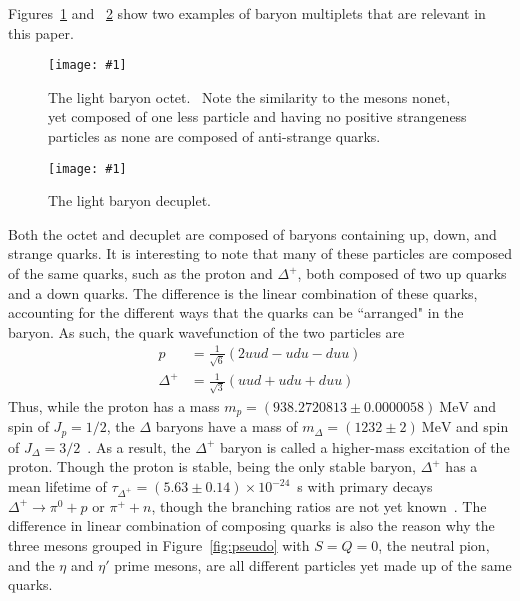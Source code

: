 \documentclass[twocolumn]{article}
\newcommand{\insertFigure}[1]{%
   \texttt{[image: \#1]}%
}
\begin{document}
\par Figures~\ref{fig:oct} and ~\ref{fig:dec} show two examples of baryon multiplets that are relevant in this paper.
\begin{figure}[!h]
	\centering
	\insertFigure{oct.png}
	\caption{The light baryon octet.~\cite{oct} Note the similarity to the mesons nonet, yet composed of one less particle and having no positive strangeness particles as none are composed of anti-strange quarks.}
	\label{fig:oct}
\end{figure}
\begin{figure}[!h]
	\centering
	\insertFigure{dec.png}
	\caption{The light baryon decuplet.~\cite{dec}}
	\label{fig:dec}
\end{figure}
Both the octet and decuplet are composed of baryons containing up, down, and strange quarks. It is interesting to note that many of these particles are composed of the same quarks, such as the proton and $\Delta^+$, both composed of two up quarks and a down quarks. The difference is the linear combination of these quarks, accounting for the different ways that the quarks can be ``arranged" in the baryon. As such, the quark wavefunction of the two particles are~\cite{Thompson}
\begin{align*}
p &= \frac {1}{\sqrt{6}} (2uud - udu - duu) \\
\Delta^+ &= \frac {1}{\sqrt{3}} (uud+udu+duu) 
\end{align*}
Thus, while the proton has a mass $m_p = (938.2720813 \pm 0.0000058)~\text{MeV}$ and spin of $J_p=1/2$, the $\Delta$ baryons have a mass of $m_\Delta = (1232 \pm 2)~\text{MeV}$ and spin of $J_\Delta=3/2$~\cite{pdg}. As a result, the $\Delta^+$ baryon is called a higher-mass excitation of the proton. Though the proton is stable, being the only stable baryon, $\Delta^+$ has a mean lifetime of $\tau_{\Delta^+}=(5.63 \pm 0.14) \times 10^{-24}$~s with primary decays $\Delta^+ \to \pi^0+p$ or $\pi^+ + n$, though the branching ratios are not yet known~\cite{pdg}. The difference in linear combination of composing quarks is also the reason why the three mesons grouped in Figure~\ref{fig:pseudo} with $S = Q = 0$, the neutral pion, and the $\eta$ and $\eta'$ prime mesons, are all different particles yet made up of the same quarks.
\end{document}
